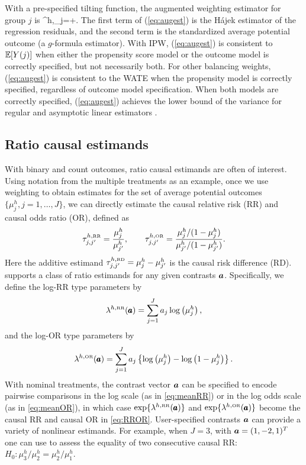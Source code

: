 With a pre-specified tilting function, the augmented weighting estimator for group $j$ is 
\be\label{eq:augest}
\hat{\mu}^{h,\aug}_j=+.
\ee
The first term of (\ref{eq:augest}) is the H\'{a}jek estimator of the regression residuals, and the second term is the standardized average potential outcome (a $g$-formula estimator). With IPW, (\ref{eq:augest}) is consistent to $\operatorname{\mathbb E}[Y(j)]$ when either the propensity score model or the outcome model is correctly specified, but not necessarily both. For other balancing weights, (\ref{eq:augest}) is consistent to the WATE when the propensity model is correctly specified, regardless of outcome model specification. When both models are correctly specified, (\ref{eq:augest}) achieves the lower bound of the variance for regular and asymptotic linear estimators \citep{Robins1994,Hirano2003,Mao2018}.


\subsection{Ratio causal estimands}\label{sec:ratioest}

With binary and count outcomes, ratio causal estimands are often of interest. Using notation from the multiple treatments as an example, once we use weighting to obtain estimates for the set of average potential outcomes $\{\mu_j^h,j=1,\ldots,J\}$, we can directly estimate the causal relative risk (RR) and causal odds ratio (OR), defined as
\begin{equation}\label{eq:RROR}
\tau^{h,\mbox{\tiny{RR}}}_{j,j^{\prime}}=\frac{\mu_{j}^h}{\mu_{j^{\prime}}^h},~~~~~~\tau^{h,\mbox{\tiny{OR}}}_{j,j^{\prime}}=\frac{\mu_{j}^h/(1-\mu_{j}^h)}{\mu_{j^{\prime}}^h/(1-\mu_{j^{\prime}}^h)}.    
\end{equation}
Here the additive estimand $\tau^{h,\mbox{\tiny{RD}}}_{j,j^{\prime}}=\mu_{j}^h-\mu_{j^{\prime}}^h$ is the causal risk difference (RD).  supports a class of ratio estimands for any given contrasts $\bm{a}$. Specifically, we define the log-RR type parameters by
\begin{equation} \label{eq:meanRR}
\lambda^{h,\mbox{\tiny{RR}}}(\pmb{a})=\sum\limits_{j=1}^{J}a_j\log\left(\mu_j^h\right),
\end{equation}
and the log-OR type parameters by
\begin{equation} \label{eq:meanOR}
\lambda^{h,\mbox{\tiny{OR}}}(\pmb{a})=\sum\limits_{j=1}^{J}a_j\left\{\log\left(\mu_j^h\right)-\log\left(1-\mu_j^h\right)\right\}.
\end{equation}
With nominal treatments, the contrast vector $\bm{a}$ can be specified to encode pairwise comparisons in the log scale (as in \eqref{eq:meanRR}) or in the log odds scale (as in \eqref{eq:meanOR}), in which case $\exp\{\lambda^{h,\mbox{\tiny{RR}}}(\pmb{a})\}$ and $\exp\{\lambda^{h,\mbox{\tiny{OR}}}(\pmb{a})\}$ become the causal RR and causal OR in \eqref{eq:RROR}.  
User-specified contrasts $\bm{a}$ can provide a variety of nonlinear estimands. For example, when $J=3$, with $\bm{a}=(1,-2,1)^T$ one can use  to assess the equality of two consecutive causal RR: $H_0: \mu_3^h/\mu_2^h=\mu_2^h/\mu_1^h$. 


